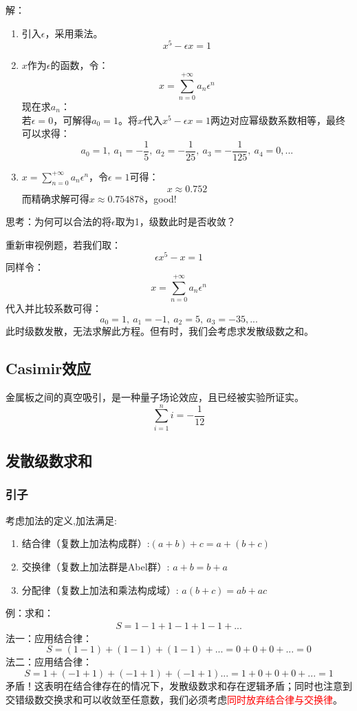 解：
\begin{enumerate}[fullwidth,itemindent=2em,label=(\arabic*)]
	\item
		引入$\epsilon$，采用乘法。
		\[x^5-\epsilon x = 1\]
	\item
		$x$作为$\epsilon$的函数，令：
		\[x=\sum_{n=0}^{+\infty}a_n \epsilon ^n\]
		现在求$a_n$：\\
		若$\epsilon=0$，可解得$a_0=1$。将$x$代入$x^5-\epsilon x = 1$两边对应幂级数系数相等，最终可以求得：
		\[a_0=1,\ a_1=-\frac{1}{5},\ a_2=-\frac{1}{25},\ a_3=-\frac{1}{125},\ a_4=0,...\]
	\item
		$x=\sum_{n=0}^{+\infty}a_n \epsilon ^n$，令$\epsilon=1$可得：
		\[x \approx 0.752\]
		而精确求解可得$x\approx0.754878$，good!
\end{enumerate}
思考：为何可以合法的将\(\epsilon\)取为1，级数此时是否收敛？

重新审视例题，若我们取：
\[\epsilon x^5-x=1\]
同样令：
\[x=\sum_{n=0}^{+\infty}a_n \epsilon ^n\]
代入并比较系数可得：
\[a_0=1,\ a_1=-1,\ a_2=5,\ a_3=-35,...\]
此时级数发散，无法求解此方程。但有时，我们会考虑求发散级数之和。

\subsection{Casimir效应}
金属板之间的真空吸引，是一种量子场论效应，且已经被实验所证实。
\[\sum_{i=1}^n i=-\frac{1}{12}\]

\subsection{发散级数求和}
\subsubsection{引子}
考虑加法的定义,加法满足:
\begin{enumerate}[fullwidth,itemindent=2em,label=(\arabic*)]
	\item 结合律（复数上加法构成群）:\((a+b)+c=a+(b+c)\) 
	\item 交换律（复数上加法群是Abel群）:  \(a+b=b+a\)
	\item 分配律（复数上加法和乘法构成域）:  \(a(b+c)=ab+ac\)
\end{enumerate}
例：求和：
\begin{align}
	S=1-1+1-1+1-1+...
	\label{1+-+-}
\end{align}
法一：应用结合律：
\[S=(1-1)+(1-1)+(1-1)+...=0+0+0+...=0\]
法二：应用结合律：
\[S=1+(-1+1)+(-1+1)+(-1+1)...=1+0+0+0+...=1\]
矛盾！这表明在结合律存在的情况下，发散级数求和存在逻辑矛盾；同时也注意到交错级数交换求和可以收敛至任意数，我们必须考虑\textcolor{red}{同时放弃结合律与交换律}。

